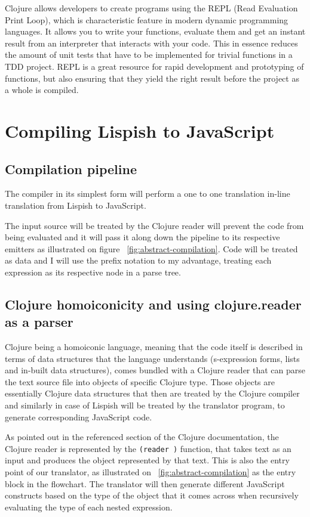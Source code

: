 Clojure allows developers to create programs using the REPL (Read Evaluation Print Loop), which is characteristic feature in modern dynamic programming languages. It allows you to write your functions, evaluate them and get an instant result from an interpreter that interacts with your code. This in essence reduces the amount of unit tests that have to be implemented for trivial functions in a TDD project. 
REPL is a great resource for rapid development and prototyping of functions, but also ensuring that they yield the right result before the project as a whole is compiled.

\section{Compiling Lispish to JavaScript}

\subsection{Compilation pipeline}



The compiler in its simplest form will perform a one to one translation in-line translation from Lispish to JavaScript. 

The input source will be treated by the Clojure reader will prevent the code from being evaluated and it will pass it along down the pipeline to its respective emitters as illustrated on figure ~\ref{fig:abstract-compilation}. Code will be treated as data and I will use the prefix notation to my advantage, treating each expression as its respective node in a parse tree. 

\subsection{Clojure homoiconicity and using clojure.reader as a parser}
Clojure being a homoiconic language, meaning that the code itself is described in terms of data structures that the language understands (s-expression forms, lists and in-built data structures), comes bundled with a Clojure reader\cite{clojure.reader} that can parse the text source file into objects of specific Clojure type. Those objects are essentially Clojure data structures that then are treated by the Clojure compiler and similarly in case of Lispish will be treated by the translator program, to generate corresponding JavaScript code. 

As pointed out in the referenced \cite{clojure.reader} section of the Clojure documentation, the Clojure reader is represented by the \texttt{(reader )} function, that takes text as an input and produces the object represented by that text. 
This is also the entry point of our translator, as illustrated on ~\ref{fig:abstract-compilation} as the entry block in the flowchart. 
The translator will then generate different JavaScript constructs based on the type of the object that it comes across when recursively evaluating the type of each nested expression. 
